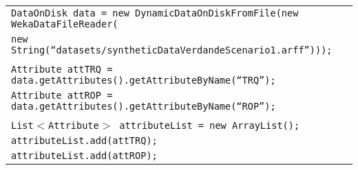 \begin{table}[H]
\begin{tabular}{l} \hline
        \texttt{DataOnDisk data = new DynamicDataOnDiskFromFile(new WekaDataFileReader(} \\
        \texttt{new String(``datasets/syntheticDataVerdandeScenario1.arff'')));}\\\\

        \texttt{Attribute attTRQ = data.getAttributes().getAttributeByName(``TRQ'');}\\
        \texttt{Attribute attROP = data.getAttributes().getAttributeByName(``ROP'');}\\\\
        
        \texttt{List$<$Attribute$>$ attributeList = new ArrayList();}\\
        \texttt{attributeList.add(attTRQ);}\\
        \texttt{attributeList.add(attROP);} \\ \hline 

\end{tabular}
\end{table}